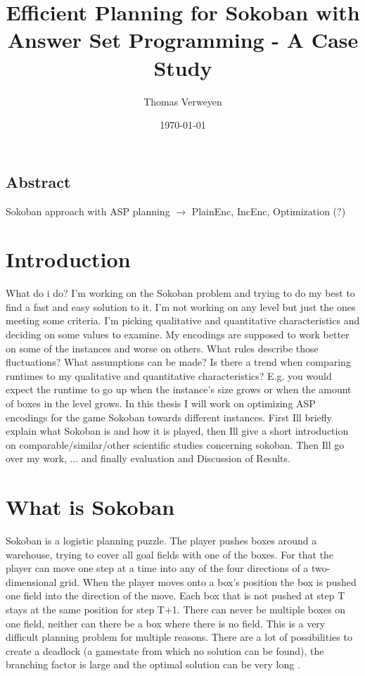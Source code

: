 \documentclass{report}
\title{Efficient Planning for Sokoban with Answer Set Programming - A Case Study}
\author{Thomas Verweyen}
\date{\today}
\begin{document}
\maketitle
\renewcommand*\contentsname{Summary}
\tableofcontents
\section*{Abstract}
Sokoban approach with ASP planning $\rightarrow$ PlainEnc, IncEnc, Optimization (?)
\chapter{Introduction}
What do i do? I'm working on the Sokoban problem and trying to do my best to find a fast and easy solution to it. I'm not working on any level but just the ones meeting some criteria. I'm picking qualitative and quantitative characteristics and deciding on some values to examine. My encodings are supposed to work better on some of the instances and worse on others. What rules describe those fluctuations? What assumptions can be made? Is there a trend when comparing runtimes to my qualitative and quantitative characteristics? E.g. you would expect the runtime to go up when the instance's size grows or when the amount of boxes in the level grows.
In this thesis I will work on optimizing ASP encodings for the game Sokoban towards different instances. First Ill briefly explain what Sokoban is and how it is played, then Ill give a short introduction on comparable/similar/other scientific studies concerning sokoban. Then Ill go over my work, ... and finally evaluation and Discussion of Results.
\chapter{What is Sokoban}
Sokoban is a logistic planning puzzle. The player pushes boxes around a warehouse, trying to cover all goal fields with one of the boxes. For that the player can move one step at a time into any of the four directions of a two-dimensional grid. When the player moves onto a box's position the box is pushed one field into the direction of the move. Each box that is not pushed at step T stays at the same position for step T+1. There can never be multiple boxes on one field, neither can there be a box where there is no field.
This is a very difficult planning problem for multiple reasons. There are a lot of possibilities to create a deadlock (a gamestate from which no solution can be found), the branching factor is large and the optimal solution can be very long \cite{BoteaHeuristicsVsPlanning}.
\end{document}
